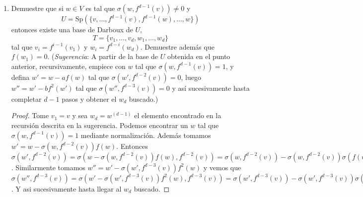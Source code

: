 \documentclass[letter,twoside,12pt]{article}
\newcommand{\Sp}{\textrm{Sp}}
\begin{document}
\begin{itemize}
\begin{enumerate}
\begin{proof}
Ahora si tomamos en general $ \sigma(u,f^{i-1}(v))=0 $ obtenemos la ecuación $$ a_{d+1}\sigma(f^{d-1}(w),f^{i-1}(v))+\cdots + a_{d+j}\sigma(f^{d-j}(w),f^{i-1}(v))+ \cdots + \sigma(a_{2d}w,f^{i-1}(v)) = 0 $$. Entonces obtenemos un sistema de $ d $ ecuaciones con $ d $ variables $ \{a_{d+1},\cdots, a_{d+j},\cdots,a_{2d}\} $. Vemos que la matriz asociada va a ser tal que la $ ij $-ésima entrada es igual a $ \sigma(f^{d-j}(w),f^{i}(v)) $.

Pero por lo discutido anteriormente todas las entradas tales que $ i+j\geq d $ van a ser iguales a 0. Luego la matriz resultante es una matriz triangular superior cuyas entradas en la diagonal son diferentes a cero por el numeral anterior. Luego, el kernel de esta matriz es igual a 0, es decir que todos los coeficientes entre $ a^{d+1} $ y $ a{2d} $ son iguales a 0.

De manera similar tomando las expresiones $ \sigma(u,f^{d-j}(w))= 0 $ podemos hacer un sistema de $ d $ ecuaciones y $ d $ incognitas $ \{a_1,\cdots,a_i,\cdots,a_d\} $ que también tiene asociada una matriz triangulas superior con todas sus entradas en la diagonal diferentes de cero y que por lo tanto implica que todos los coeficientes desde $ a_1 $ hasta $ a_d $ son iguales a 0. Por lo tanto $ u = 0 $ y el espacio es un espacio simpléctico.




\end{proof}
\item Demuestre que si $w\in V$ es tal que $\sigma(w,f^{d-1}(v))\ne 0$ y $$U=\Sp(\{v,\ldots,f^{d-1}(v),f^{d-1}(w),\ldots,w\})$$ entonces existe una base de Darboux de $U$, $$T=\{v_1,\ldots,v_{d},w_1,\ldots,w_{d}\}$$ tal que $v_i=f^{i-1}(v_1)$ y $w_i=f^{d-i}(w_d)$. Demuestre adem\'as que $f(w_1)=0$. (\emph{Sugerencia}: A partir de la base de $U$ obtenida en el punto anterior, recursivamente, empiece con $w$ tal que $\sigma(w,f^{d-1}(v))=1$, y defina $w'=w-af(w)$ tal que $\sigma(w',f^{d-2}(v))=0$, luego $w''=w'-bf^2(w')$ tal que $\sigma(w'',f^{d-3}(v))=0$ y as\'i sucesivamente hasta completar $d-1$ pasos y obtener el $w_{d}$ buscado.)

\begin{proof}
Tome $ v_1 = v $ y sea $ w_d = w^{(d-1)} $ el elemento encontrado en la recursión descrita en la sugerencia. Podemos encontrar un $ w $ tal que $\sigma(w,f^{d-1}(v)) = 1 $ mediante normalización. Además tomamos $ w' = w - \sigma(w,f^{d-2}(v))f(w) $. Entonces $ \sigma(w',f^{d-2}(v)) =\sigma(w-\sigma(w,f^{d-2}(v))f(w),f^{d-2}(v)) = \sigma(w,f^{d-2}(v))-\sigma(w,f^{d-2}(v))\sigma(f(w),f^{d-2}(v)) = \sigma(w,f^{d-2}(v))-\sigma(w,f^{d-2}(v)) = 0 $. Similarmente tomamos $ w'' = w'-\sigma(w',f^{d-3}(v))f^2(w) $ y vemos que $ \sigma(w'',f^{d-3}(v)) =\sigma(w'-\sigma(w',f^{d-3}(v))f^2(w),f^{d-3}(v)) = \sigma(w',f^{d-3}(v))-\sigma(w',f^{d-3}(v))\sigma(f^2(w),f^{d-3}) = \sigma(w',f^{d-2}(v))-\sigma(w',f^{d-2}(v)) = 0 $. Y asi sucesivamente hasta llegar al $ w_d $ buscado.


\end{proof}
\end{enumerate}
\end{itemize}
\end{document}
